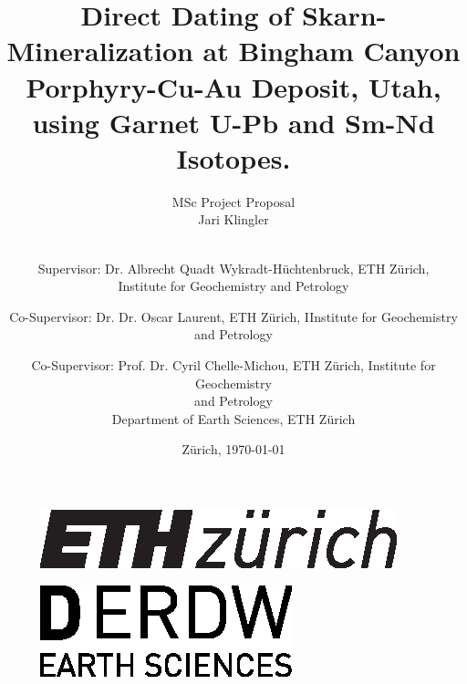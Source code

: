 \documentclass[a4paper,11pt,titlepage]{article}
\begin{document}

\begin{figure}
\centering
\vspace{-1.5cm}
\hspace{-1cm}
\begin{minipage}{.3\textwidth}
  \centering
  \includegraphics[width=\linewidth]{pictures/eth_logo_kurz_pos.eps}
  \label{fig:ETHlogo}
\end{minipage}
\vspace{1.5cm}
\hspace{5cm}
\begin{minipage}{.2\textwidth}
  \centering
  \includegraphics[width=\linewidth]{pictures/logo_D_ERDW_pfade.eps}
  \label{fig:LogoERDW}
\end{minipage}
\end{figure}


\title{\huge{Direct Dating of Skarn-Mineralization at Bingham Canyon Porphyry-Cu-Au Deposit, Utah, using Garnet U-Pb and Sm-Nd Isotopes.}}
\author{\LARGE{{MSc Project Proposal}
\vspace{10pt}}
\\
Jari Klingler \\ \\\vspace{20pt}  \and 
Supervisor: Dr. Albrecht Quadt Wykradt-Hüchtenbruck, ETH Zürich, \\ Institute for Geochemistry and Petrology \vspace{2pt}\and Co-Supervisor: Dr. Dr. Oscar Laurent, ETH Zürich, IInstitute for Geochemistry and Petrology \vspace{2pt}\and Co-Supervisor: Prof. Dr. Cyril Chelle-Michou, ETH Zürich, Institute for Geochemistry \\ and Petrology
\vspace{40pt}
\\Department of Earth Sciences, ETH Zürich}
\date{Zürich, \today}
\end{document}
